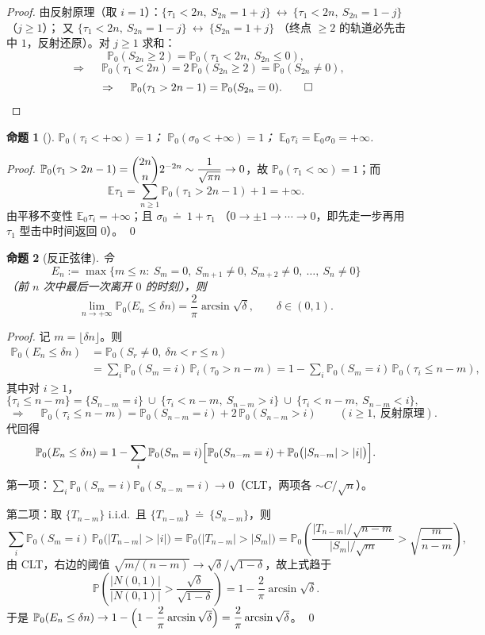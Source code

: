 \documentclass[lang=cn,10pt,newtx,thmcnt=chapter,mode=simple]{vividbook}
\providecommand{\E}{}\renewcommand{\E}{\mathbb{E}}
\providecommand{\Pp}{}\renewcommand{\Pp}{\mathbb{P}}
\newcommand{\darr}{\;\Rightarrow\;}
\theoremstyle{vividthm}
\newtheorem*{vividproposition}{命题}
\theoremstyle{vividdef}
\theoremstyle{vividexa}
\theoremstyle{vividrem}
\renewenvironment{proposition}[1][]{\begin{vividproposition}[#1]}{\end{vividproposition}}
\begin{document}
\begin{proof}
由反射原理（取 $i=1$）：$\{\tau_1<2n,\ S_{2n}=1+j\}\ \leftrightarrow\ \{\tau_1<2n,\ S_{2n}=1-j\}$（$j\ge1$）；
又 $\{\tau_1<2n,\ S_{2n}=1-j\}\ \longleftrightarrow\ \{S_{2n}=1+j\}$
（终点 $\ge2$ 的轨道必先击中 $1$，反射还原）。对 $j\ge1$ 求和：
\[
\Pp_0(S_{2n}\ge2)=\Pp_0(\tau_1<2n,\ S_{2n}\le0),
\]
\[
\darr\quad \Pp_0(\tau_1<2n)=2\,\Pp_0(S_{2n}\ge2)=\Pp_0(S_{2n}\ne0),
\]
\[
\darr\quad \Pp_0(\tau_1>2n-1)=\Pp_0(S_{2n}=0). \qed
\]
\end{proof}

\begin{proposition}
$\Pp_0(\tau_i<+\infty)=1$；\quad
$\Pp_0(\sigma_0<+\infty)=1$；\quad
$\E_0\tau_i=\E_0\sigma_0=+\infty$.
\end{proposition}

\begin{proof}
$\Pp_0(\tau_1>2n-1)=\dbinom{2n}{n}2^{-2n}\sim\dfrac{1}{\sqrt{\pi n}}\to0$，故
$\Pp_0(\tau_1<\infty)=1$；而
\[
\E\tau_1=\sum_{n\ge1}\Pp_0(\tau_1>2n-1)+1=+\infty .
\]
由平移不变性 $\E_0\tau_i=+\infty$；且 $\sigma_0\ \doteq\ 1+\tau_1$
（$0\to\pm1\to\cdots\to0$，即先走一步再用 $\tau_1$ 型击中时间返回 $0$）。 \qed
\end{proof}

\begin{proposition}[反正弦律]
令
\[
E_n:=\max\bigl\{m\le n:\ S_m=0,\ S_{m+1}\ne0,\ S_{m+2}\ne0,\ \dots,\ S_n\ne0\bigr\}
\]
（前 $n$ 次中最后一次离开 $0$ 的时刻），则
\[
\lim_{n\to+\infty}\Pp_0\bigl(E_n\le\delta n\bigr)=\frac{2}{\pi}\arcsin\sqrt{\delta},
\qquad \delta\in(0,1).
\]
\end{proposition}

\begin{proof}
记 $m=\lfloor\delta n\rfloor$。则
\begin{align*}
\Pp_0(E_n\le\delta n)&=\Pp_0(S_r\ne0,\ \delta n<r\le n)\\
&=\sum_i\Pp_0(S_m=i)\,\Pp_i(\tau_0>n-m)
=1-\sum_i\Pp_0(S_m=i)\,\Pp_0(\tau_i\le n-m),
\end{align*}
其中对 $i\ge1$，
\[
\{\tau_i\le n-m\}=\{S_{n-m}=i\}\ \cup\ \{\tau_i<n-m,\ S_{n-m}>i\}\ \cup\ \{\tau_i<n-m,\ S_{n-m}<i\},
\]
\[
\darr\quad \Pp_0(\tau_i\le n-m)=\Pp_0(S_{n-m}=i)+2\,\Pp_0(S_{n-m}>i)
\qquad(i\ge1,\ \text{反射原理}).
\]
代回得
\[
\Pp_0(E_n\le\delta n)
=1-\sum_i\Pp_0(S_m=i)\Bigl[\Pp_0(S_{n-m}=i)+\Pp_0\bigl(|S_{n-m}|>|i|\bigr)\Bigr].
\]
第一项：$\sum_i\Pp_0(S_m=i)\Pp_0(S_{n-m}=i)\to0$（CLT，两项各 $\sim C/\sqrt{n}$）。

第二项：取 $\{T_{n-m}\}$ i.i.d.\ 且 $\{T_{n-m}\}\ \doteq\ \{S_{n-m}\}$，则
\[
\sum_i\Pp_0(S_m=i)\,\Pp_0\bigl(|T_{n-m}|>|i|\bigr)
=\Pp_0\bigl(|T_{n-m}|>|S_m|\bigr)
=\Pp_0\!\left(\frac{|T_{n-m}|/\sqrt{n-m}}{|S_m|/\sqrt{m}}>\sqrt{\frac{m}{n-m}}\right),
\]
由 CLT，右边的阈值 $\sqrt{m/(n-m)}\to\sqrt{\delta}/\sqrt{1-\delta}$，故上式趋于
\[
\Pp\left(\frac{|N(0,1)|}{|N(0,1)|}>\frac{\sqrt{\delta}}{\sqrt{1-\delta}}\right)
=1-\frac{2}{\pi}\arcsin\sqrt{\delta} .
\]
于是 $\Pp_0(E_n\le\delta n)\to1-\Bigl(1-\dfrac{2}{\pi}\arcsin\sqrt{\delta}\Bigr)
=\dfrac{2}{\pi}\arcsin\sqrt{\delta}$。 \qed
\end{proof}
\end{document}
